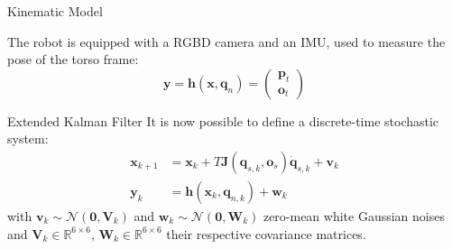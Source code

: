 \documentclass[10pt]{beamer}
\begin{document}
\begin{frame}{Kinematic Model}

        The robot is equipped with a RGBD camera and an IMU, used
        to measure the pose of the torso frame:
        \begin{equation*}
            \bm{y} = \bm{h}(\bm{x}, \bm{q}_n) =
                \begin{pmatrix}
                    \bm{p}_t \\
                    \bm{o}_t
                \end{pmatrix}
        \end{equation*}
    \end{frame}

    \begin{frame}{Extended Kalman Filter}
        \justifying
        It is now possible to define a discrete-time stochastic system:
        \begin{align*}
            \bm{x}_{k+1} &= \bm{x}_k + T \bm{J}(\bm{q}_{s,k}, \bm{o}_s) \bm{\dot{q}}_{s,k} + \bm{v}_k \\
            \bm{y}_k &= \bm{h}(\bm{x}_k, \bm{q}_{n,k}) + \bm{w}_k
        \end{align*}
        with
        $\bm{v}_k \sim \bm{\mathcal{N}}(\bm{0}, \bm{V}_k)$ and
        $\bm{w}_k \sim \bm{\mathcal{N}}(\bm{0}, \bm{W}_k)$ zero-mean
        white Gaussian noises and
        $\bm{V}_k \in \mathbb{R}^{6 \times 6}$,
        $\bm{W}_k \in \mathbb{R}^{6 \times 6}$ their respective
        covariance matrices.
    \end{frame}
\end{document}
